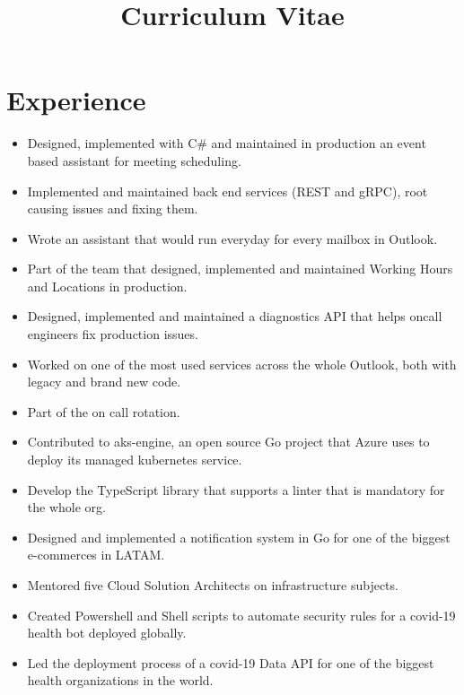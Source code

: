 \documentclass[10pt, a4paper, roman]{moderncv} %
\title{Curriculum Vitae}
\begin{document}
\makecvtitle %

\section{Experience}

{
    \begin{itemize}
	    \item Designed, implemented with C\# and maintained in production an event based assistant for meeting scheduling.
        \item Implemented and maintained back end services (REST and gRPC), root causing issues and fixing them.
        \item Wrote an assistant that would run everyday for every mailbox in Outlook.
	    \item Part of the team that designed, implemented and maintained Working Hours and Locations in production.
        \item Designed, implemented and maintained a diagnostics API that helps oncall engineers fix production issues.
        \item Worked on one of the most used services across the whole Outlook, both with legacy and brand new code.
        \item Part of the on call rotation.
    \end{itemize}
}

{
    \begin{itemize}
	    \item Contributed to aks-engine, an open source Go project that Azure uses to deploy its managed kubernetes service. 
	    \item Develop the TypeScript library that supports a linter that is mandatory for the whole org.
        \item Designed and implemented a notification system in Go for one of the biggest e-commerces in LATAM.
        \item Mentored five Cloud Solution Architects on infrastructure subjects.
        \item Created Powershell and Shell scripts to automate security rules for a covid-19 health bot deployed globally.
        \item Led the deployment process of a covid-19 Data API for one of the biggest health organizations in the world.
    \end{itemize}
}
\end{document}
